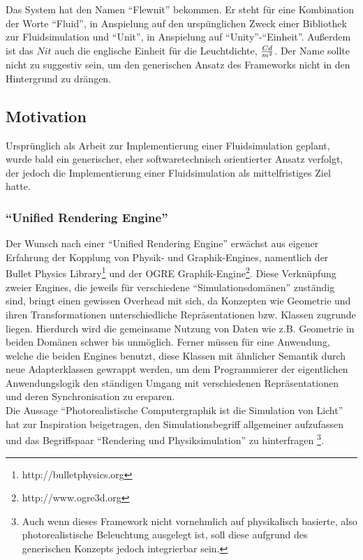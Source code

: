 Das System hat den Namen "`Flewnit"' bekommen. Er steht für eine Kombination der Worte "`Fluid"', in Anspielung auf den urspünglichen Zweck einer Bibliothek zur Fluidsimulation und "`Unit"', in Anspielung auf "`Unity"'-"`Einheit"'.
Außerdem ist das $Nit$ auch  die englische Einheit für die Leuchtdichte, $Cd \over m^2$. Der Name sollte nicht
zu suggestiv sein, um den generischen Ansatz des Frameworks nicht in den Hintergrund zu drängen.



\subsection{Motivation}

Ursprünglich als Arbeit zur Implementierung einer Fluidsimulation geplant, wurde bald ein generischer, eher softwaretechnisch orientierter Ansatz verfolgt, der jedoch die Implementierung einer Fluidsimulation als mittelfristiges Ziel hatte.

\subsubsection{"`Unified Rendering Engine"'}
Der Wunsch nach einer "`Unified Rendering Engine"' erwächst aus eigener Erfahrung der Kopplung von Physik- und Graphik-Engines, namentlich der Bullet Physics Library\footnote{http://bulletphysics.org} und der OGRE Graphik-Engine\footnote{http://www.ogre3d.org}. Diese Verknüpfung zweier Engines, die jeweils für verschiedene "`Simulationsdomänen"' zuständig sind, bringt einen gewissen Overhead mit sich, da Konzepten wie  Geometrie und ihren Transformationen unterschiedliche Repräsentationen bzw. Klassen zugrunde liegen.
Hierdurch wird die gemeinsame Nutzung von Daten wie z.B. Geometrie in beiden Domänen schwer bis unmöglich.
Ferner müssen für eine Anwendung, welche die beiden Engines benutzt, diese Klassen mit ähnlicher Semantik durch neue Adapterklassen gewrappt werden,
um dem Programmierer der eigentlichen Anwendungslogik den ständigen Umgang mit verschiedenen Repräsentationen und deren Synchronisation zu ersparen.\\

Die Aussage "`Photorealistische Computergraphik ist die Simulation von Licht"' hat zur Inspiration beigetragen, den Simulationsbegriff allgemeiner aufzufassen und das Begriffspaar "`Rendering und Physiksimulation"' zu hinterfragen \footnote{Auch wenn dieses Framework nicht vornehmlich auf physikalisch basierte, also photorealistische Beleuchtung ausgelegt ist, soll diese aufgrund des generischen Konzepts jedoch integrierbar sein.}.

